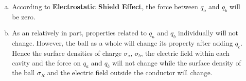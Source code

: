 \documentclass[12pt,a4paper]{article}
\begin{document}
\begin{enumerate}[(a)]
    \item According to \textbf{Electrostatic Shield Effect}, the force between $q_a$ and $q_b$ will be zero.
    
    \item As an relatively in part, properties related to $q_a$ and $q_b$ individually will not change. However, the ball as a whole will change its property after adding $q_c$. \\
    Hence the surface densities of charge $\sigma_a$, $\sigma_b$, the electric field within each cavity and the force on $q_a$ and $q_b$ will not change while the surface density of the ball $\sigma_R$ and the electric field outside the conductor will change.
\end{enumerate}
\end{document}
